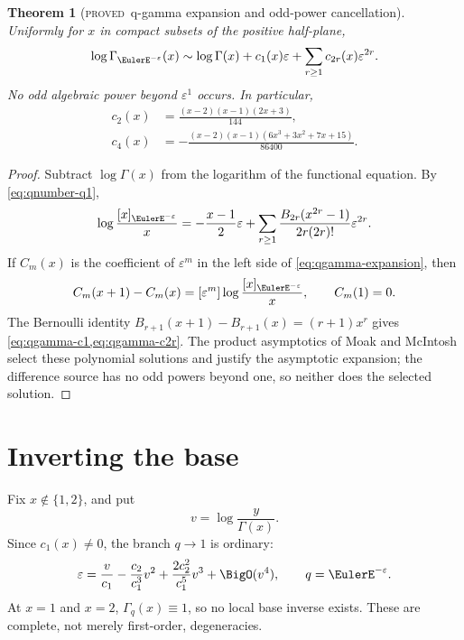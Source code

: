 \documentclass[11pt,letterpaper,oneside,openany]{book}
\newtheorem{theorem}{Theorem}[chapter]
\theoremstyle{definition}
\theoremstyle{remark}
\newcommand{\statusproved}{\textcolor{provedgreen}{\textsc{proved}}}
\begin{document}
\begin{theorem}[\statusproved\ q-gamma expansion and odd-power cancellation]
Uniformly for \(x\) in compact subsets of the positive half-plane,
\begin{equation}
 \log\Gamma_{\EulerE^{-\varepsilon}}(x)
 \sim \log\Gamma(x)+c_1(x)\varepsilon
 +\sum_{r\ge1}c_{2r}(x)\varepsilon^{2r}.
 \label{eq:qgamma-expansion}
\end{equation}
No odd algebraic power beyond \(\varepsilon^1\) occurs.  In particular,
\begin{align}
 c_2(x)&=\frac{(x-2)(x-1)(2x+3)}{144}, \label{eq:qgamma-c2}\\
 c_4(x)&=-\frac{(x-2)(x-1)(6x^3+3x^2+7x+15)}{86400}.
 \label{eq:qgamma-c4}
\end{align}
\end{theorem}
\begin{proof}
Subtract \(\log\Gamma(x)\) from the logarithm of the functional equation.  By
\cref{eq:qnumber-q1},
\begin{equation}
 \log\frac{[x]_{\EulerE^{-\varepsilon}}}{x}
 =-\frac{x-1}{2}\varepsilon
 +\sum_{r\ge1}\frac{B_{2r}(x^{2r}-1)}{2r(2r)!}
 \varepsilon^{2r}.
 \label{eq:qgamma-difference-source}
\end{equation}
If \(C_m(x)\) is the coefficient of \(\varepsilon^m\) in the left side of
\cref{eq:qgamma-expansion}, then
\[
 C_m(x+1)-C_m(x)=[\varepsilon^m]
 \log\frac{[x]_{\EulerE^{-\varepsilon}}}{x},
 \qquad C_m(1)=0.
\]
The Bernoulli identity
\(B_{r+1}(x+1)-B_{r+1}(x)=(r+1)x^r\) gives
\cref{eq:qgamma-c1,eq:qgamma-c2r}.  The product asymptotics of
Moak and McIntosh \cite{Moak1984,McIntosh1999} select these polynomial
solutions and justify the asymptotic expansion; the difference source has no
odd powers beyond one, so neither does the selected solution.
\end{proof}

\section{Inverting the base}
Fix \(x\notin\{1,2\}\), and put
\[
 v=\log\frac{y}{\Gamma(x)}.
\]
Since \(c_1(x)\ne0\), the branch \(q\to1\) is ordinary:
\begin{equation}
 \varepsilon=\frac{v}{c_1}
 -\frac{c_2}{c_1^3}v^2
 +\frac{2c_2^2}{c_1^5}v^3+\BigO(v^4),
 \qquad q=\EulerE^{-\varepsilon}.
 \label{eq:qgamma-base-inverse}
\end{equation}
At \(x=1\) and \(x=2\), \(\Gamma_q(x)\equiv1\), so no local base inverse
exists.  These are complete, not merely first-order, degeneracies.
\end{document}
